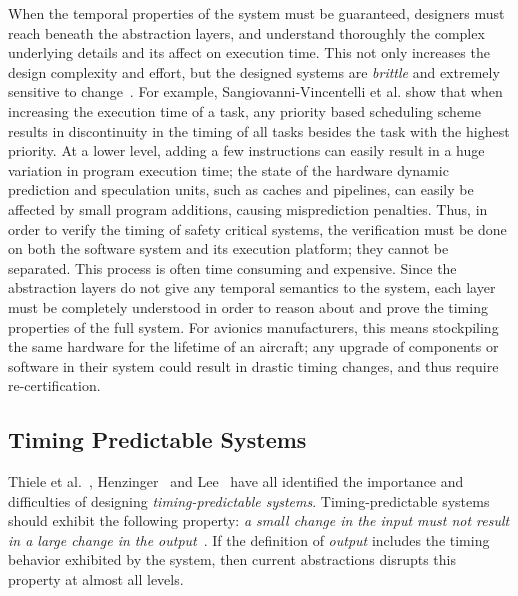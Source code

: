 When the temporal properties of the system must be guaranteed, designers must reach beneath the abstraction layers, and understand thoroughly the complex underlying details and its affect on execution time. 
This not only increases the design complexity and effort, but the designed systems are \emph{brittle} and extremely sensitive to change~\cite{Sangiovanni-Vincentelli2007automotive, edwards2007case}.  
For example, Sangiovanni-Vincentelli et al.\cite{Sangiovanni-Vincentelli2007automotive} show that when increasing the execution time of a task, any priority based scheduling scheme results in discontinuity in the timing of all tasks besides the task with the highest priority. 
At a lower level, adding a few instructions can easily result in a huge variation in program execution time; the state of the hardware dynamic prediction and speculation units, such as caches and pipelines, can easily be affected by small program additions, causing misprediction penalties.
Thus, in order to verify the timing of safety critical systems, the verification must be done on both the software system and its execution platform; they cannot be separated. 
This process is often time consuming and expensive.
Since the abstraction layers do not give any temporal semantics to the system, each layer must be completely understood in order to reason about and prove the timing properties of the full system.  
For avionics manufacturers, this means stockpiling the same hardware for the lifetime of an aircraft; any upgrade of components or software in their system could result in drastic timing changes, and thus require re-certification.


\subsection{Timing Predictable Systems}
Thiele et al.~\cite{thiele:04:predictable}, Henzinger~\cite{Henzinger2008} and Lee~\cite{LeeOnTime2005} have all identified the importance and difficulties of designing \emph{timing-predictable systems}.
Timing-predictable systems should exhibit the following property: \textit{a small change in the input must not result in a large change in the output}~\cite{Henzinger2008}.
If the definition of \emph{output} includes the timing behavior exhibited by the system, then current abstractions disrupts this property at almost all levels. 


